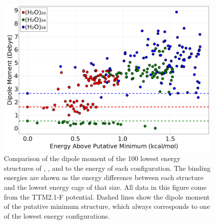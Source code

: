 \begin{figure}[t]
\uwsinglespace
\begin{center}
\includegraphics[width=.85\textwidth]{Figures/Chapter_6/all_clathrate_cages_dipole_vs_energy.png}
\end{center}
\begin{spacing}{1.0}
\caption[Comparison of the dipole moment of the 100 lowest energy structures of , , and  to the energy of each configuration. The binding energies are shown as the energy difference between each structure and the lowest energy cage of that size. All data in this figure come from the TTM2.1-F potential. Dashed lines show the dipole moment of the putative minimum structure, which always corresponds to one of the lowest energy configurations.]{Comparison of the dipole moment of the 100 lowest energy structures of , , and  to the energy of each configuration. The binding energies are shown as the energy difference between each structure and the lowest energy cage of that size. All data in this figure come from the TTM2.1-F potential. Dashed lines show the dipole moment of the putative minimum structure, which always corresponds to one of the lowest energy configurations.}\label{fig:MBE_III_F8}
\end{spacing}
\end{figure}
